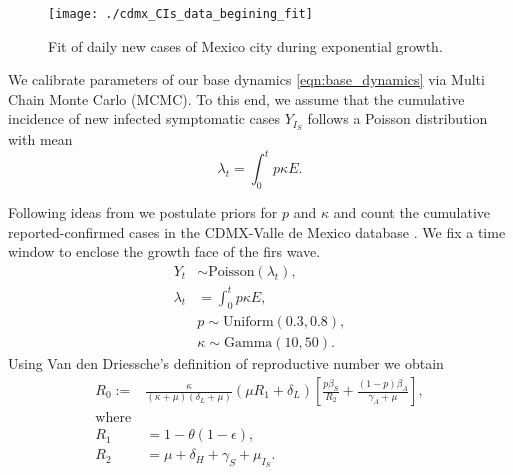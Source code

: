 \begin{figure*}[htb]
    \centering
    \texttt{[image: ./cdmx\_CIs\_data\_begining\_fit]}
    \caption{%
        Fit of daily new cases of Mexico city
        during exponential growth.
    }
    \label{fig:data_CDMX_fitting}
\end{figure*}
%
We calibrate parameters of our base dynamics
\eqref{eqn:base_dynamics} via Multi Chain Monte Carlo (MCMC).
To this end, we assume that the cumulative
incidence of new infected symptomatic cases $Y_{I_S}$
follows a Poisson distribution with mean 
$$
    \lambda_t = 
        \int_{0} ^ t
        p \kappa E.
$$ 
%

    Following ideas from \cite{Acuna2020} we postulate priors for 
$p$ and $\kappa$ and count the cumulative reported-confirmed cases in 
the CDMX-Valle de Mexico database \cite{cdmxDATA}. We fix a time window
to enclose the growth face of the firs wave.
\begin{equation}
    \label{eqn:boservation_model}
    \begin{aligned}
        Y_t & \sim \text{Poisson}(\lambda_t),
        \\
        \lambda_t
        &=
        \int_{0}^t p \kappa E ,
        \\
        & p \sim \text{Uniform} (0.3, 0.8),
        \\
        & \kappa \sim \text{Gamma}(10, 50).
    \end{aligned}
\end{equation}
%
Using Van den Driessche's \cite{Van2002} definition of reproductive number
we obtain
\begin{equation*}
    \label{eqn:reproductive_number}
    \begin{aligned}
        R_0 :=
        &
        \frac{\kappa}{(\kappa + \mu)(\delta_L + \mu)}
        \left(
            \mu R_1 + \delta_L
        \right)
        \left[
            \frac{p\beta_S}{R_2}
            +\frac{(1 - p) \beta_A}{\gamma_A+\mu}
        \right],
    \\
    \text{where} &
    \\
        R_1 &= 1 - \theta(1 - \epsilon),
    \\
        R_2 &= \mu + \delta_H + \gamma_S + \mu_{I_{S}}.
    \end{aligned}
\end{equation*}

